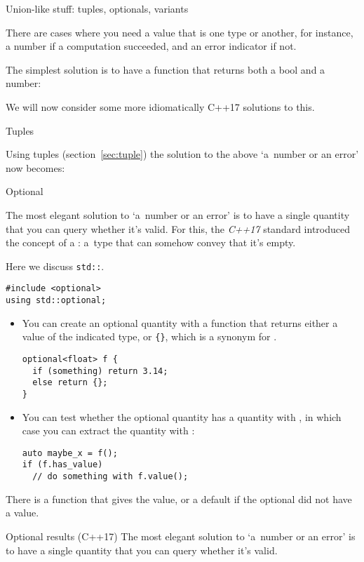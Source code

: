  {Union-like stuff: tuples, optionals, variants}

There are cases where you need a value that is one type or another,
for instance, a number if a computation succeeded, and an error
indicator if not.

The simplest solution is to have a function that returns both a bool
and a number:
%

We will now consider some more idiomatically C++17 solutions to this.

 {Tuples}

Using tuples (section~\ref{sec:tuple}) 
the solution to the above `a~number or an error' now becomes:
%

 {Optional}
\label{sec:std-optional}

The most elegant solution to `a~number or an error' is to have a
single quantity that you can query whether it's valid.
For this, the
\emph{C++17} standard
introduced the concept of a :
a~type that can somehow convey that it's empty.

Here we discuss \lstinline{std::}.

\begin{lstlisting}
#include <optional>
using std::optional;
\end{lstlisting}

\begin{itemize}
\item You can create an optional quantity with a function that returns
  either a value of the indicated type, or \verb+{}+, which is a
  synonym for .
\begin{lstlisting}
optional<float> f {
  if (something) return 3.14;
  else return {};
}
\end{lstlisting}
\item You can test whether the optional quantity has a quantity with
  , in which case you can extract the quantity
  with :
\begin{lstlisting}
auto maybe_x = f();
if (f.has_value)
  // do something with f.value();
\end{lstlisting}
\end{itemize}

There is a function  that gives the value, or
a default if the optional did not have a value.

\begin{slide}{Optional results (C++17)}
  \label{sl:optional-root}
  The most elegant solution to `a~number or an error' is to have a
  single quantity that you can query whether it's valid.
\end{slide}


